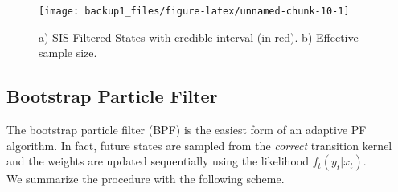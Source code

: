 \documentclass[
]{book}
\theoremstyle{break}
\theoremstyle{nonumberplain}
\begin{document}
\begin{figure}[H]

{\centering \texttt{[image: backup1\_files/figure-latex/unnamed-chunk-10-1]} 

}

\caption{a) SIS Filtered States with credible interval (in red). b) Effective sample size.}\label{fig:unnamed-chunk-10}
\end{figure}

\subsection{Bootstrap Particle Filter}

The bootstrap particle filter (BPF) is the easiest form of an adaptive
PF algorithm. In fact, future states are sampled from the
\textit{correct} transition kernel and the weights are updated
sequentially using the likelihood \(f_t(y_t|x_t)\).\\
We summarize the procedure with the following scheme.
\end{document}
